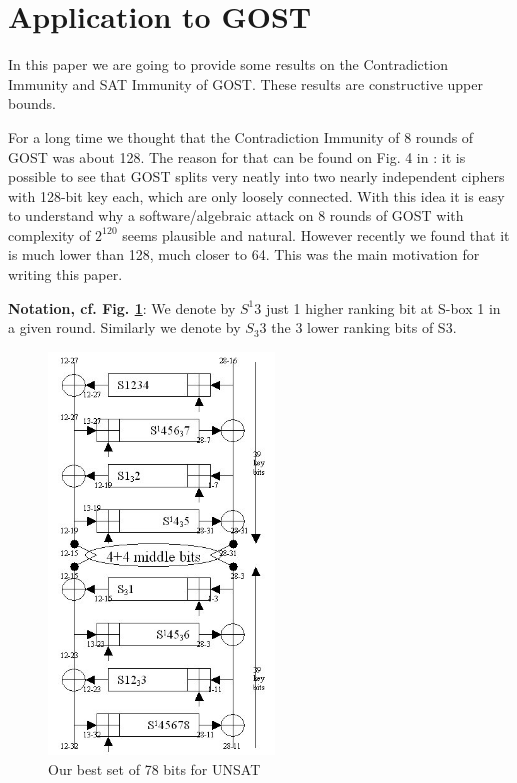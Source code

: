 \section{Application to GOST}

In this paper we are going to provide some results on the Contradiction Immunity and SAT Immunity of GOST. These results are constructive upper bounds.

For a long time we thought that the Contradiction Immunity of 8 rounds of GOST was about 128.
The reason for that can be found on Fig. 4 in \cite{gostdc2}:
it is possible to see that GOST splits very neatly into
two nearly independent ciphers with 128-bit key each,
which are only loosely connected.
With this idea it is easy to understand why a software/algebraic
attack on 8 rounds of GOST with complexity of $2^{120}$
seems plausible and natural.
However recently we found that it is much lower than 128,
much closer to 64.
This was the main motivation for writing this paper.

{\bf Notation, cf. Fig. \ref{Gost81optimal4KPUNSAT78}}:
We denote by $S^{1}3$ just 1 higher ranking bit at S-box 1 in a given round.
Similarly we denote by $S_{3}3$ the 3 lower ranking bits of S3.

\begin{figure}[h]
	\centering
	\includegraphics[width=60mm]{./pics/gost81optimal4KP.jpg}
	\caption{Our best set of 78 bits for UNSAT}
	\label{Gost81optimal4KPUNSAT78}
\end{figure}

